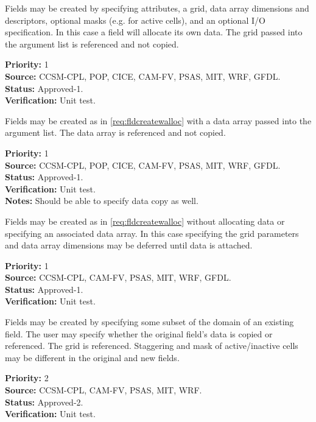 


\label{req:fldcreatewalloc}
Fields may be created by specifying attributes, a grid, 
data array dimensions and descriptors, optional masks (e.g. for 
active cells), and an optional I/O specification.  In this case 
a field will allocate its own data.  The grid passed into the 
argument list is referenced and not copied.
\begin{reqlist} 
{\bf Priority:} 1\\
{\bf Source:} CCSM-CPL, POP, CICE, CAM-FV, PSAS, MIT, WRF, GFDL. \\
{\bf Status:} Approved-1. \\
{\bf Verification:} Unit test. 
\end{reqlist}

Fields may be created as in \ref{req:fldcreatewalloc} with a data 
array passed into the argument list.  The data array 
is referenced and not copied.
\begin{reqlist} 
{\bf Priority:} 1 \\
{\bf Source:} CCSM-CPL, POP, CICE, CAM-FV, PSAS, MIT, WRF, GFDL. \\
{\bf Status:} Approved-1. \\
{\bf Verification:} Unit test. \\
{\bf Notes:} Should be able to specify data copy as well.
\end{reqlist}

Fields may be created as in \ref{req:fldcreatewalloc} without allocating 
data or specifying an associated data array.  In this case specifying the 
grid parameters and data array dimensions may be deferred until 
data is attached.
\begin{reqlist} 
{\bf Priority:} 1 \\
{\bf Source:} CCSM-CPL, CAM-FV, PSAS, MIT, WRF, GFDL. \\
{\bf Status:} Approved-1. \\
{\bf Verification:} Unit test. 
\end{reqlist}

Fields may be created by specifying some subset of the domain of an 
existing field.  The user may specify whether the original field's data 
is copied or referenced.  The grid is referenced.  Staggering 
and mask of active/inactive cells may be different in the 
original and new fields.
\begin{reqlist} 
{\bf Priority:} 2 \\
{\bf Source:} CCSM-CPL, CAM-FV, PSAS, MIT, WRF. \\
{\bf Status:} Approved-2. \\
{\bf Verification:} Unit test. 
\end{reqlist}

